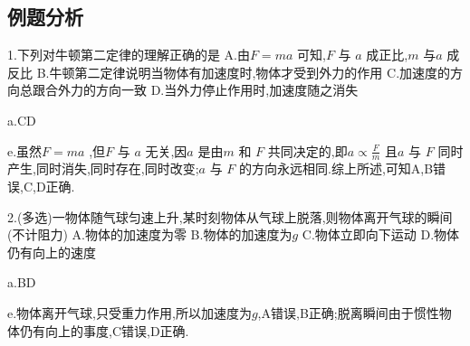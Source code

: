 \subsection{例题分析}
\begin{selection}
  1.下列对牛顿第二定律的理解正确的是
  A.由$F=ma$ 可知,$F$ 与 $a$ 成正比,$m$ 与$a$ 成反比
  B.牛顿第二定律说明当物体有加速度时,物体才受到外力的作用
  C.加速度的方向总跟合外力的方向一致
  D.当外力停止作用时,加速度随之消失

  a.CD

  e.虽然$F=ma$ ,但$F$ 与 $a$ 无关,因$a$ 是由$m$ 和 $F$ 共同决定的,即$a\propto \frac{F}{m}$ 且$a$ 与 $F$ 同时产生,同时消失,同时存在,同时改变;$a$ 与 $F$ 的方向永远相同.综上所述,可知A,B错误,C,D正确.

  2.(多选)一物体随气球匀速上升,某时刻物体从气球上脱落,则物体离开气球的瞬间(不计阻力)
  A.物体的加速度为零
  B.物体的加速度为$g$
  C.物体立即向下运动
  D.物体仍有向上的速度

  a.BD

  e.物体离开气球,只受重力作用,所以加速度为$g$,A错误,B正确;脱离瞬间由于惯性物体仍有向上的事度,C错误,D正确.

\end{selection}
